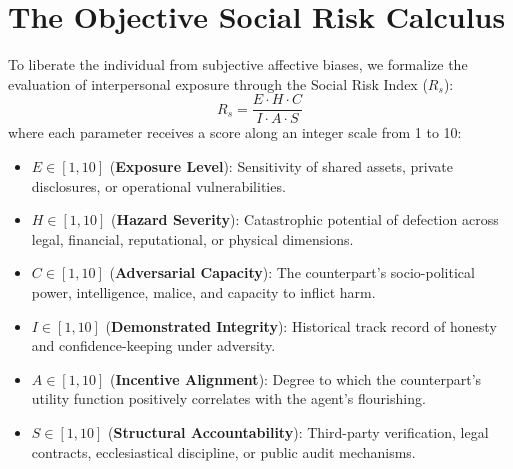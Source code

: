 \documentclass[11pt,twocolumn]{article}
\begin{document}
\section{The Objective Social Risk Calculus}

To liberate the individual from subjective affective biases, we formalize the evaluation of interpersonal exposure through the Social Risk Index ($R_s$):
\begin{equation}
    R_s = \frac{E \cdot H \cdot C}{I \cdot A \cdot S}
\end{equation}
where each parameter receives a score along an integer scale from 1 to 10:
\begin{itemize}
    \item $E \in [1, 10]$ (\textbf{Exposure Level}): Sensitivity of shared assets, private disclosures, or operational vulnerabilities.
    \item $H \in [1, 10]$ (\textbf{Hazard Severity}): Catastrophic potential of defection across legal, financial, reputational, or physical dimensions.
    \item $C \in [1, 10]$ (\textbf{Adversarial Capacity}): The counterpart's socio-political power, intelligence, malice, and capacity to inflict harm.
    \item $I \in [1, 10]$ (\textbf{Demonstrated Integrity}): Historical track record of honesty and confidence-keeping under adversity.
    \item $A \in [1, 10]$ (\textbf{Incentive Alignment}): Degree to which the counterpart's utility function positively correlates with the agent's flourishing.
    \item $S \in [1, 10]$ (\textbf{Structural Accountability}): Third-party verification, legal contracts, ecclesiastical discipline, or public audit mechanisms.
\end{itemize}
\end{document}
